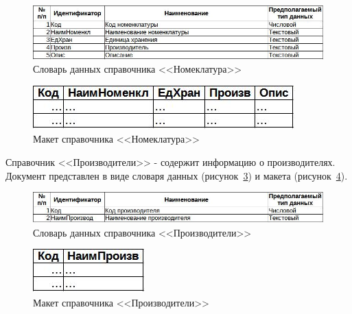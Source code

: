 \documentclass[12pt, a4paper, simple]{eskdtext}
\begin{document}
    \begin{figure}[!h]
        \centering
        \includegraphics[width=14cm]
            {_docs/СП_Номенкл_типы.jpg}
        \caption{Словарь данных справочника <<Номеклатура>>}
        \label{fig:CP_Nomenkl_tipi}
    \end{figure}

    \begin{figure}[!h]
        \centering
        \includegraphics[]
            {_docs/СП_Номенкл_макет.jpg}
        \caption{Макет справочника <<Номеклатура>>}
        \label{fig:CP_Nomenkl_maket}
    \end{figure}

    \newpage

    Справочник <<Производители>> - содержит информацию о производителях.
    Документ представлен в виде словаря данных (рисунок~\ref{fig:CP_Proizv_tipi})
    и макета (рисунок~\ref{fig:CP_Proizv_maket}).

    \begin{figure}[!h]
        \centering
        \includegraphics[width=14cm]
            {_docs/СП_Произв_типы.jpg}
        \caption{Словарь данных справочника <<Производители>>}
        \label{fig:CP_Proizv_tipi}
    \end{figure}

    \begin{figure}[!h]
        \centering
        \includegraphics[]
            {_docs/СП_Произв_макет.jpg}
        \caption{Макет справочника <<Производители>>}
        \label{fig:CP_Proizv_maket}
    \end{figure}
\end{document}
